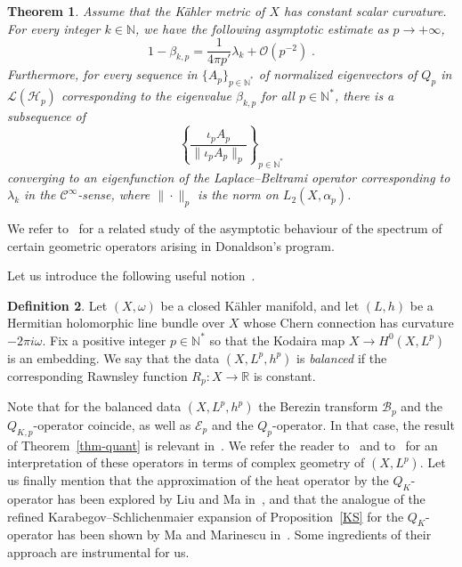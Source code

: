 \documentclass[11pt]{article}
\newtheorem{theo}{Theorem}[section]
\theoremstyle{definition}
\newtheorem{defi}[theo]{Definition}
\numberwithin{equation}{section}
\numberwithin{figure}{section}
\numberwithin{table}{section}
\newcommand{\R}{{\mathbb{R}}}
\newcommand{\N}{{\mathbb{N}}}
\newcommand{\cB}{{\mathcal{B}}}
\newcommand{\cE}{{\mathcal{E}}}
\newcommand{\cH}{{\mathcal{H}}}
\newcommand{\bigo}{\mathcal{O}}
\newcommand\< {\mathcal{h}}
\renewcommand\> {\mathcal{i}}
\newcommand*\cC{\mathscr{C}}
\newcommand*\cL{\mathscr{L}}
\begin{document}
\begin{theo}\label{cor-quant}
Assume that the K\"ahler metric of $X$ has constant scalar curvature. For every integer $k\in\N$, we have the following asymptotic estimate as $p\to +\infty$,
\begin{equation}\label{eq-LQ}
1-\beta_{k,p} =\frac{1}{4\pi p'}\lambda_k + \bigo\left(p^{-2}\right)\;.
\end{equation}
Furthermore, for every sequence in $\{A_p\}_{p\in\N^*}$ of normalized eigenvectors of $Q_p$ in $\cL(\cH_p)$ corresponding to the eigenvalue $\beta_{k,p}$ for all $p\in\N^*$, there is a subsequence of
\begin{equation}\label{ipAp}
\left\{ \frac{\iota_pA_p}{\|\iota_pA_p\|_p}\right\}_{p\in\N^*}
\end{equation}
converging to an eigenfunction of the Laplace--Beltrami operator corresponding to $\lambda_k$ in the $\cC^\infty$-sense, where $\|\cdot\|_p$ is the norm on $L_2(X,\alpha_p)$.
\end{theo}

We refer to~\cite{Fin12,Keller16} for a related study of the asymptotic behaviour of the spectrum of certain geometric operators arising in Donaldson's program.

Let us introduce the following useful notion~\cite{D,Fine-lectures}.


\begin{defi}\label{def-balanced}
Let $(X,\omega)$ be a closed K\"ahler manifold, and let $(L,h)$ be a Hermitian
holomorphic line bundle over $X$ whose Chern connection has curvature $-2\pi i\omega$. Fix a positive integer $p\in\N^*$ so that the Kodaira map $X \to H^0(X,L^p)$ is an embedding. We say that the data $(X,L^p,h^p)$ is \emph{balanced} if the corresponding Rawnsley function $R_p:X\rightarrow\R$ is constant.
\end{defi}


Note that for the balanced data $(X,L^p,h^p)$ the Berezin transform $\cB_p$ and the $Q_{K,p}$-operator coincide, as well as $\cE_p$ and the $Q_p$-operator. In that case, the result of Theorem~\ref{thm-quant} is relevant in~\cite[Section~4.3]{D}. We refer the reader to~\cite[Section~4.1]{D} and to~\cite[Section~1.4.1]{Fin10} for an interpretation of these operators in terms of complex geometry of $(X,L^p)$. Let us finally mention that the approximation of the heat operator by the $Q_K$-operator has been explored by Liu and Ma in~\cite{LM07}, and that the analogue of the refined Karabegov--Schlichenmaier expansion of Proposition~\ref{KS} for the $Q_K$-operator has been shown by Ma and Marinescu in~\cite[Theorem~6.1]{MM12}. Some ingredients of their approach are instrumental for us.
\end{document}
